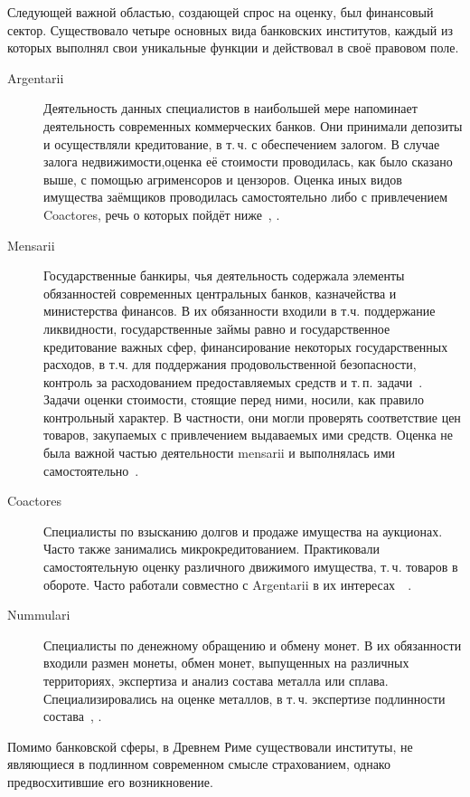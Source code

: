 \documentclass[12pt]{scrartcl}
\begin{document}
Следующей важной областью, создающей спрос на оценку, был финансовый сектор. Существовало четыре основных вида банковских институтов, каждый из которых выполнял свои уникальные функции и действовал в своё правовом поле.
\begin{description}
	\item[Argentarii] Деятельность данных специалистов в наибольшей мере напоминает деятельность современных коммерческих банков. Они принимали депозиты и осуществляли кредитование, в т.\,ч. с обеспечением залогом. В случае залога недвижимости,оценка её стоимости проводилась, как было сказано выше, с помощью агрименсоров и цензоров. Оценка иных видов имущества заёмщиков проводилась самостоятельно либо с привлечением Coactores, речь о которых пойдёт ниже~\cite{Andreau1999}, \cite{Billeter1939}.
	\item[Mensarii] Государственные банкиры, чья деятельность содержала элементы обязанностей современных центральных банков, казначейства и министерства финансов. В их обязанности входили в т.ч. поддержание ликвидности, государственные займы равно и государственное кредитование важных сфер, финансирование некоторых государственных расходов, в т.ч. для поддержания продовольственной безопасности, контроль за расходованием предоставляемых средств и т.\,п. задачи~\cite{Wild_1977}. Задачи оценки стоимости, стоящие перед ними, носили, как правило контрольный характер. В частности, они могли проверять соответствие цен товаров, закупаемых с привлечением выдаваемых ими средств. Оценка не была важной частью деятельности mensarii и выполнялась ими самостоятельно~\cite{Rostovtzeff1957}.
	\item[Coactores] Специалисты по взысканию долгов и продаже имущества на аукционах. Часто также занимались микрокредитованием. Практиковали самостоятельную оценку различного движимого имущества, т.\,ч. товаров в обороте. Часто работали совместно с Argentarii в их интересах~\cite{Crook1994}~\cite{Hollander2007}.
	\item[Nummulari] Специалисты по денежному обращению и обмену монет. В их обязанности входили размен монеты, обмен монет, выпущенных на различных территориях, экспертиза и анализ состава металла или сплава. Специализировались на оценке металлов, в т.\,ч. экспертизе подлинности состава~\cite{Howgego1997}, \cite{Sutherland1974}.
\end{description}
Помимо банковской сферы, в Древнем Риме существовали институты, не являющиеся в подлинном современном смысле страхованием, однако предвосхитившие его возникновение.
\end{document}
